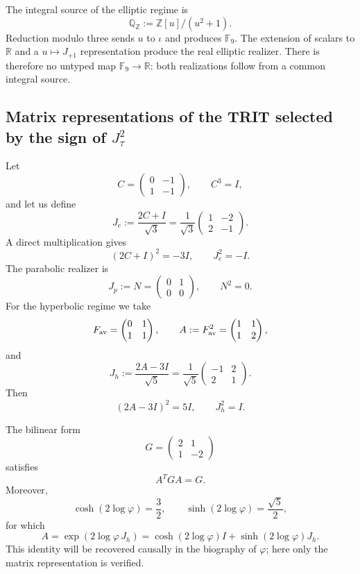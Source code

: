 The integral source of the elliptic regime is
\[
 \mathbb Q_{\mathbb Z}:=\mathbb Z[u]/(u^2+1).
\]
Reduction modulo three sends \(u\) to \(\iota\) and produces
\(\mathbb F_9\). The extension of scalars to \(\mathbb R\) and a
\(u\mapsto J_{+1}\) representation produce the real elliptic realizer.
There is therefore no untyped map \(\mathbb F_9\to\mathbb R\): both
realizations follow from a common integral source.

\subsection{Matrix representations of the TRIT selected by the sign of \(J_\tau^2\)}

Let
\[
 C=\begin{pmatrix}0&-1\\1&-1\end{pmatrix},
 \qquad C^3=I,
\]
and let us define
\[
 J_e:=\frac{2C+I}{\sqrt3}
 =\frac1{\sqrt3}\begin{pmatrix}1&-2\\2&-1\end{pmatrix}.
\]
A direct multiplication gives
\[
 (2C+I)^2=-3I,
 \qquad J_e^2=-I.
\]
The parabolic realizer is
\[
 J_p:=N=\begin{pmatrix}0&1\\0&0\end{pmatrix},
 \qquad N^2=0.
\]
For the hyperbolic regime we take
\[
 F_{\rm av}=\begin{pmatrix}0&1\\1&1\end{pmatrix},
 \qquad
 A:=F_{\rm av}^2=\begin{pmatrix}1&1\\1&2\end{pmatrix},
\]
and
\[
 J_h:=\frac{2A-3I}{\sqrt5}
 =\frac1{\sqrt5}\begin{pmatrix}-1&2\\2&1\end{pmatrix}.
\]
Then
\[
 (2A-3I)^2=5I,
 \qquad J_h^2=I.
\]

The bilinear form
\[
 G=\begin{pmatrix}2&1\\1&-2\end{pmatrix}
\]
satisfies
\[
 A^TGA=G.
\]
Moreover,
\[
 \cosh(2\log\varphi)=\frac32,
 \qquad
 \sinh(2\log\varphi)=\frac{\sqrt5}{2},
\]
for which
\[
 A=\exp(2\log\varphi\,J_h)
  =\cosh(2\log\varphi)I+\sinh(2\log\varphi)J_h.
\]
This identity will be recovered causally in the biography of
\(\varphi\); here only the matrix representation is verified.

